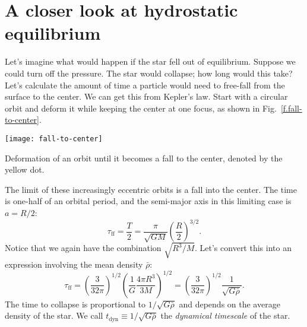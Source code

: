 \section{A closer look at hydrostatic equilibrium}
\label{s.closer-look}

Let's imagine what would happen if the star fell out of equilibrium.  Suppose we could turn off the pressure.  The star would collapse; how long would this take?  Let's calculate the amount of time a particle would need to free-fall from the surface to the center.  We can get this from Kepler's law. Start with a circular orbit and deform it while keeping the center at one focus, as shown in Fig.~\ref{f.fall-to-center}.  

\begin{marginfigure}
\texttt{[image: fall-to-center]}
\caption[Fall to center]{\label{f.fall-to-center} Deformation of an orbit until it becomes a fall to the center, denoted by the yellow dot.}
\end{marginfigure}

The limit of these increasingly eccentric orbits is a fall into the center.  The time is one-half of an orbital period, and the semi-major axis in this limiting case is $a = R/2$:
\[
\tau_{\mathrm{ff}} = \frac{T}{2} = \frac{\pi}{\sqrt{GM}} \left(\frac{R}{2}\right)^{3/2}.
\]
Notice that we again have the combination $\sqrt{R^{3}/M}$.  Let's convert this into an expression involving the mean density $\bar{\rho}$:
\begin{equation}\label{e.tff}
\tau_{\mathrm{ff}} = \left(\frac{3}{32\pi}\right)^{1/2}\left(\frac{1}{G}\frac{4\pi R^{3}}{3M}\right)^{1/2} = \left(\frac{3}{32\pi}\right)^{1/2} \frac{1}{\sqrt{G\bar{\rho}}}.
\end{equation}
The time to collapse is proportional to $1/\sqrt{G\bar{\rho}}$ and depends on the average density of the star. We call $t_{\mathrm{dyn}} \equiv 1/\sqrt{G\bar{\rho}}$ the \emph{dynamical timescale} of the star.

